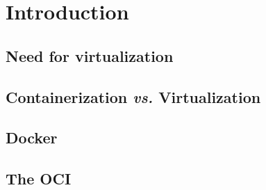 \section{Introduction}
\label{sec::intro}




\subsection{Need for virtualization}
\label{ssec::intro:need-virt}

\subsection{Containerization \emph{vs.} Virtualization}
\label{ssec::intro:cont-vs-virt}

\subsection{Docker}
\label{ssec::intro:docker}

\subsection{The OCI}
\label{ssec::intro:oci}
